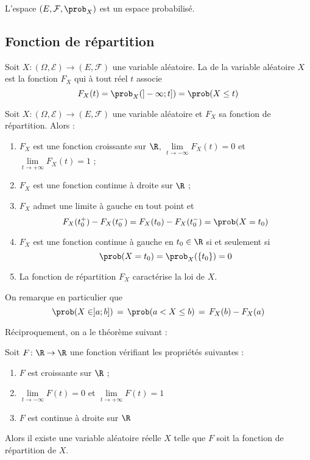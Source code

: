 \begin{theoreme}{}{}
	L'espace  $(E,\mathcal{F},\prob_X)$ est un espace probabilisé.
\end{theoreme}



\subsection{Fonction de répartition}\label{section_fonctionrepartition}

\begin{definition}{}{}
	Soit $X \colon (\Omega,\mathcal{E}) \to (E,\mathcal{F})$ une variable aléatoire. La  de la variable aléatoire $X$ est la fonction  $F_X$ qui à tout réel $t$ associe
	$$F_X(t)=\prob_X(]-\infty;t]) = \prob(X\leq t)$$
\end{definition}

\begin{proposition}{}{}
	Soit $X \colon (\Omega,\mathcal{E}) \to (E,\mathcal{F})$ une variable aléatoire et $F_X$ sa fonction de répartition. Alors :
	\begin{enumerate}
		\item $F_X$ est une fonction croissante sur $\R$, $\lim\limits_{t \to -\infty} F_X(t)=0$ et $\lim\limits_{t \to +\infty} F_X(t)=1$ ;
		\item $F_X$ est une fonction continue à droite sur $\R$ ;
		\item $F_X$ admet une limite à gauche en tout point et 
		$$F_X(t_0^+)-F_X(t_0^-) = F_X(t_0)-F_X(t_0^-) = \prob(X=t_0)$$
		\item $F_X$ est une fonction continue à gauche en $t_0 \in \R$ si et seulement si $$ \prob(X=t_0) = \prob_X(\{t_0\})=0$$
		\item La fonction de répartition $F_X$ caractérise la loi de $X$.
	\end{enumerate}
	
	On remarque en particulier que $$\prob(X \in ]a;b])\,=\,\prob(a < X \le b)\,=\,F_X(b) - F_X(a)$$
\end{proposition}

Réciproquement, on a le théorème suivant :

\begin{theoreme}{}{}
	Soit $F \colon \R \rightarrow \R$ une fonction vérifiant les propriétés suivantes :
	\begin{enumerate}
		\item $F$ est croissante sur $\R$ ;
		\item  $\lim\limits_{t \to -\infty} F(t)=0$ et $\lim\limits_{t \to +\infty} F(t)=1$
		\item $F$ est continue à droite sur $\R $
	\end{enumerate}
Alors il existe une variable aléatoire réelle $X$ telle que $F$ soit la fonction de répartition de $X$. 
\end{theoreme}

